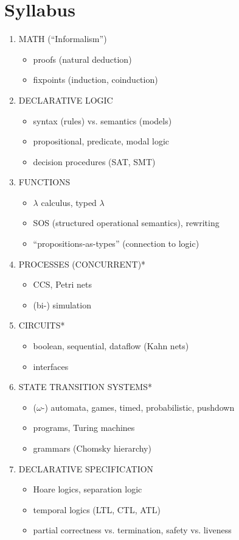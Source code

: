 \section{Syllabus}
\begin{enumerate}
  \item MATH (``Informalism'')
  \begin{itemize}
    \item proofs (natural deduction)
    \item fixpoints (induction, coinduction)
  \end{itemize}
  \item DECLARATIVE LOGIC
  \begin{itemize}
    \item syntax (rules) vs. semantics (models)
    \item propositional, predicate, modal logic 
    \item decision procedures (SAT, SMT)
  \end{itemize}
  \item FUNCTIONS
  \begin{itemize}
    \item $\lambda$ calculus, typed $\lambda$
    \item SOS (structured operational semantics), rewriting
    \item ``propositions-as-types'' (connection to logic)
  \end{itemize}
  \item PROCESSES (CONCURRENT)* 
  \begin{itemize}
    \item CCS, Petri nets
    \item (bi-) simulation
  \end{itemize}
  \item CIRCUITS*
  \begin{itemize}
    \item boolean, sequential, dataflow (Kahn nets)
    \item interfaces
  \end{itemize}
  \item STATE TRANSITION SYSTEMS*
  \begin{itemize}
    \item ($\omega$-) automata, games, timed, probabilistic, pushdown
    \item programs, Turing machines 
    \item grammars (Chomsky hierarchy)
  \end{itemize} 
  \item DECLARATIVE SPECIFICATION
  \begin{itemize}
    \item Hoare logics, separation logic 
    \item temporal logics (LTL, CTL, ATL)
    \item partial correctness vs. termination, safety vs. liveness 
  \end{itemize}
\end{enumerate}

